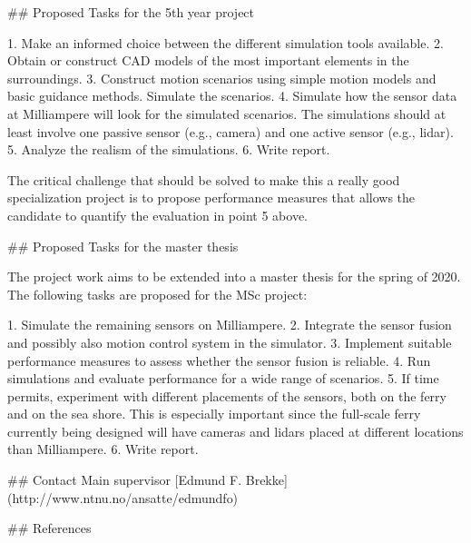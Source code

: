 ## Proposed Tasks for the 5th year project

1. Make an informed choice between the different simulation tools available. 
2. Obtain or construct CAD models of the most important elements in the surroundings. 
3. Construct motion scenarios using simple motion models and basic guidance methods. Simulate the scenarios. 
4. Simulate how the sensor data at Milliampere will look for the simulated scenarios. The simulations should at least involve one passive sensor (e.g., camera) and one active sensor (e.g., lidar). 
5. Analyze the realism of the simulations. 
6. Write report.

The critical challenge that should be solved to make this a really good specialization project is to propose performance measures that allows the candidate to quantify the evaluation in point 5 above. 

## Proposed Tasks for the master thesis

The project work aims to be extended into a master thesis for the spring of 2020. The following tasks are proposed for the MSc project:

1. Simulate the remaining sensors on Milliampere. 
2. Integrate the sensor fusion and possibly also motion control system in the simulator.
3. Implement suitable performance measures to assess whether the sensor fusion is reliable. 
4. Run simulations and evaluate performance for a wide range of scenarios.
5. If time permits, experiment with different placements of the sensors, both on the ferry and on the sea shore. This is especially important since the full-scale ferry currently being designed will have cameras and lidars placed at different locations than Milliampere.
6. Write report. 

## Contact
Main supervisor [Edmund F. Brekke](http://www.ntnu.no/ansatte/edmundfo)

## References


